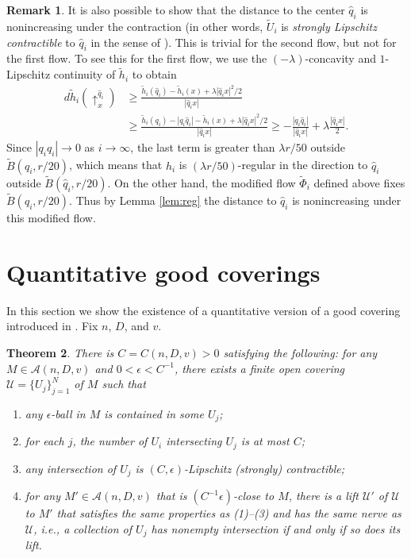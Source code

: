 \documentclass[a4paper,12pt]{amsart}
\theoremstyle{plain}
\newtheorem{thm}{Theorem}
\theoremstyle{definition}
\newtheorem{rem}[thm]{Remark}
\numberwithin{thm}{section}
\numberwithin{equation}{section}
\begin{document}
\begin{rem}
It is also possible to show that the distance to the center $\hat q_i$ is nonincreasing under the contraction (in other words, $\tilde U_i$ is \textit{strongly Lipschitz contractible} to $\hat q_i$ in the sense of \cite[1.4]{MY:stab}).
This is trivial for the second flow, but not for the first flow.
To see this for the first flow, we use the $(-\lambda)$-concavity and $1$-Lipschitz continuity of $\tilde h_i$ to obtain
\begin{align*}
d\tilde h_i(\uparrow_x^{\hat q_i})&\ge\frac{\tilde h_i(\hat q_i)-\tilde h_i(x)+\lambda|\hat q_ix|^2/2}{|\hat q_ix|}\\
&\ge\frac{\tilde h_i(q_i)-|q_i\hat q_i|-\tilde h_i(x)+\lambda|\hat q_ix|^2/2}{|\hat q_ix|}\ge-\frac{|q_i\hat q_i|}{|\hat q_ix|}+\lambda\frac{|\hat q_ix|}2.
\end{align*}
Since $|q_i\hat q_i|\to 0$ as $i\to\infty$, the last term is greater than $\lambda r/50$ outside $\tilde B(\hat q_i,r/20)$, which means that $h_i$ is $(\lambda r/50)$-regular in the direction to $\hat q_i$ outside $\tilde B(\hat q_i,r/20)$.
On the other hand, the modified flow $\tilde\Phi_i$ defined above fixes $\tilde B(\hat q_i,r/20)$.
Thus by Lemma \ref{lem:reg} the distance to $\hat q_i$ is nonincreasing under this modified flow.
\end{rem}

\section{Quantitative good coverings}\label{sec:good}

In this section we show the existence of a quantitative version of a good covering introduced in \cite{MY:good}.
Fix $n$, $D$, and $v$.

\begin{thm}\label{thm:good}
There is $C=C(n,D,v)>0$ satisfying the following:
for any $M\in \mathcal A(n,D,v)$ and $0<\epsilon<C^{-1}$, there exists a finite open covering $\mathcal U=\{ U_j\}_{j=1}^{N}$ of $M$ such that
\begin{enumerate}
\item any $\epsilon$-ball in $M$ is contained in some $U_j$;
\item for each $j$, the number of $U_i$ intersecting $U_j$ is at most $C$;
\item any intersection of $U_j$ is $(C,\epsilon)$-Lipschitz (strongly) contractible;
\item for any $M'\in\mathcal A(n,D,v)$ that is $(C^{-1}\epsilon)$-close to $M$, there is a lift $\mathcal U'$ of $\mathcal U$ to $M'$ that satisfies the same properties as (1)--(3) and has the same nerve as $\mathcal U$, i.e., a collection of $U_j$ has nonempty intersection if and only if so does its lift.
\end{enumerate}
\end{thm}
\end{document}
